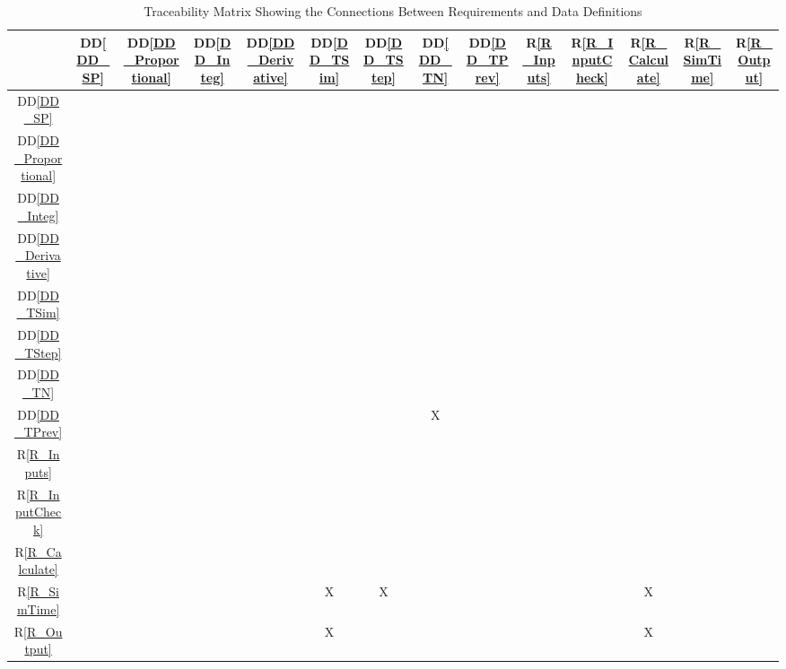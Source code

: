 \documentclass[12pt]{article}
\newcommand{\ddref}[1]{DD\ref{#1}}
\newcommand{\rref}[1]{R\ref{#1}}
\begin{document}
\begin{table}[h!]
\centering
\begin{tabular}{|c|c|c|c|c|c|c|c|c|c|c|c|c|c|}
\hline
	& \ddref{DD_SP}& \ddref{DD_Proportional}& \ddref{DD_Integ}& 
    \ddref{DD_Derivative}& \ddref{DD_TSim}& \ddref{DD_TStep}& 
    \ddref{DD_TN} & \ddref{DD_TPrev} & \rref{R_Inputs}& 
    \rref{R_InputCheck}& \rref{R_Calculate}& \rref{R_SimTime}& 
    \rref{R_Output}\\
\hline
\ddref{DD_SP}               & & & & & & & & & & & & &\\ \hline
\ddref{DD_Proportional}     & & & & & & & & & & & & &\\ \hline
\ddref{DD_Integ}            & & & & & & & & & & & & &\\ \hline
\ddref{DD_Derivative}       & & & & & & & & & & & & &\\ \hline
\ddref{DD_TSim}             & & & & & & & & & & & & &\\ \hline
\ddref{DD_TStep}            & & & & & & & & & & & & &\\ \hline
\ddref{DD_TN}               & & & & & & & & & & & & &\\ \hline
\ddref{DD_TPrev}            & & & & & & &X & & & & & &\\ \hline
\rref{R_Inputs}             & & & & & & & & & & & & &\\ \hline
\rref{R_InputCheck}         & & & & & & & & & & & & &\\ \hline
\rref{R_Calculate}          & & & & & & & & & & & & &\\ \hline
\rref{R_SimTime}            & & & & &X &X & & & & &X & &\\ \hline
\rref{R_Output}             & & & & &X & & & & & &X & &\\
\hline
\end{tabular}
\caption{Traceability Matrix Showing the Connections Between Requirements and 
Data Definitions }
\label{Table:R_DD_trace}
\end{table}




\end{document}
